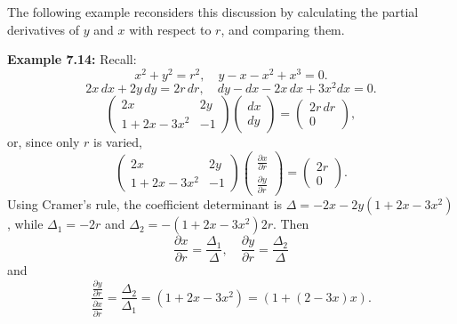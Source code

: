 \begin{original}
The following example reconsiders this discussion by calculating the partial derivatives of $y$ and $x$ with respect to $r$, and comparing them.

\textbf{Example 7.14:} Recall:
\[
x^2 + y^2 = r^2, \quad y - x - x^2 + x^3 = 0.
\]
\[
2x\,dx + 2y\,dy = 2r\,dr, \quad dy - dx - 2x\,dx + 3x^2 dx = 0.
\]
\[
\begin{pmatrix} 2x & 2y \\ 1 + 2x - 3x^2 & -1 \end{pmatrix}
\begin{pmatrix} dx \\ dy \end{pmatrix}
= \begin{pmatrix} 2r\,dr \\ 0 \end{pmatrix},
\]
or, since only $r$ is varied,
\[
\begin{pmatrix} 2x & 2y \\ 1 + 2x - 3x^2 & -1 \end{pmatrix}
\begin{pmatrix} \frac{\partial x}{\partial r} \\[2pt] \frac{\partial y}{\partial r} \end{pmatrix}
= \begin{pmatrix} 2r \\ 0 \end{pmatrix}.
\]
Using Cramer's rule, the coefficient determinant is $\Delta = -2x - 2y(1 + 2x - 3x^2)$, while $\Delta_1 = -2r$ and $\Delta_2 = -(1 + 2x - 3x^2)2r$. Then
\[
\frac{\partial x}{\partial r} = \frac{\Delta_1}{\Delta}, \quad \frac{\partial y}{\partial r} = \frac{\Delta_2}{\Delta}
\]
and
\[
\frac{\frac{\partial y}{\partial r}}{\frac{\partial x}{\partial r}} = \frac{\Delta_2}{\Delta_1} = (1 + 2x - 3x^2) = (1 + (2 - 3x)x).
\]
\end{original}

